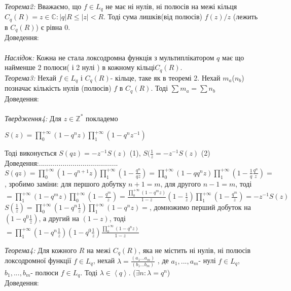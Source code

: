 \documentclass[12pt,a4paper]{article}
\begin{document}
\emph{Теорема2:} Вважаємо, що $f\in L_{q}$ не має ні нулів, ні полюсів на межі кільця $C_{q}(R)={z\in \mathbb{C}:\left |q  \right |R\leq \left |z  \right |<R }$. Тоді сума лишків(від полюсів) $f(z)/z$ (лежить в $C_{q}(R)$) є рівна $0$.\\
Доведення:\\
\\
\emph{Наслідок:} Кожна не стала локсодромна функція з мультиплікатором $q$ має що найменше 2 полюси( і 2 нулі ) в кожному кільці$C_{q}(R)$.\\
  
\emph{Теорема3:} Нехай $f\in L_{q}$ і $C_{q}(R)$- кільце, таке як в теоремі 2. Нехай $m_{a}$($n_{b}$) позначає кількість нулів (полюсів) $f$ в $C_{q}(R)$. Тоді $\sum m_{a}=\sum n_{b}$ \\
Доведення:\\
\\

\emph{Твердження4:} Для $z \in \mathbb{Z}^{*}$ покладемо
  \begin{center}
	$S(z)= \prod_{0}^{+\infty } ( 1-q^{n}z ) \prod_{1}^{+\infty }( 1-q^{n}z^{-1} )$
  \end{center} Тоді виконується $S(qz)=-z^{-1}S(z)$ (1), $S(\frac{1}{z}=-z^{-1}S(z)$ (2)\\
Доведення:........................................\\
$S(qz)= \prod_{0}^{+\infty } ( 1-q^{n+1}z ) \prod_{1}^{+\infty }( 1-\frac{q^{n}}{qz})=
 \prod_{0}^{+\infty } ( 1-qq^{n}z ) \prod_{1}^{+\infty }( 1-\frac{1}{q}\frac{q^{n}}{z})=$, зробимо заміни: для першого добутку $n+1=m$, для другого $n-1=m$, тоді $=\prod_{1}^{+\infty } ( 1-q^{m}z ) \prod_{0}^{+\infty }( 1-\frac{q^{m}}{z})=\frac{\prod_{0}^{+\infty } ( 1-q^{m}z )}{1-z}(1-\frac{1}{z})\prod_{1}^{+\infty }( 1-\frac{q^{m}}{z})=-z^{-1}S(z)$ \\
 $S(\frac{1}{z})= \prod_{0}^{+\infty } ( 1-q^{n}\frac{1}{z} ) \prod_{1}^{+\infty }( 1-q^{n}z)=$, домножимо перший добуток на $(1-q^{0}\frac{1}{z})$, а другий на $(1-z)$, тоді $=\prod_{1}^{+\infty } ( 1-q^{n}\frac{1}{z} )(1-q^{0}\frac{1}{z})\frac{ \prod_{0}^{+\infty }( 1-q^{n}z)}{1-z}$

\emph{Теорема4:} Для кожного $R$ на межі $C_{q}(R)$, яка не містить ні нулів, ні полюсів локсодромної функції $f\in L_{q}$, нехай $\lambda=\frac{(a_{1}...a_{m})}{(b_{1}...b_{m})}$ , де $a_{1},...,a_{m}$- нулі $f\in L_{q}$, $b_{1},...,b_{m}$- полюси $f\in L_{q}$. Тоді $\lambda\in \left \langle q \right \rangle$. ($ \exists n:\lambda =q^{n}$)\\
Доведення:
\\
\end{document}
